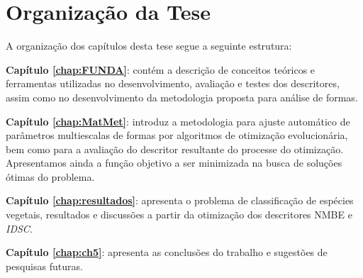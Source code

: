 \section{Organização da Tese \label{sec:org}}

A organização dos capítulos desta tese segue a seguinte estrutura:

\noindent \textbf{Capítulo \ref{chap:FUNDA}}: contém a descrição de conceitos teóricos e ferramentas utilizadas no desenvolvimento, avaliação e testes dos descritores, assim como no desenvolvimento da metodologia proposta para análise de formas.

\noindent \textbf{Capítulo \ref{chap:MatMet}}:  introduz a metodologia para ajuste automático de parâmetros multiescalas de formas por algoritmos de otimização evolucionária, bem como para a avaliação do descritor resultante do processe do otimização. Apresentamos ainda a função objetivo a ser minimizada na busca de soluções ótimas do problema.

\noindent \textbf{Capítulo \ref{chap:resultados}}: apresenta o problema de classificação de espécies vegetais, resultados e discussões a partir da otimização dos descritores NMBE e \emph{IDSC}.

\noindent \textbf{Capítulo \ref{chap:ch5}}: apresenta as conclusões do trabalho e sugestões de pesquisas futuras. 

